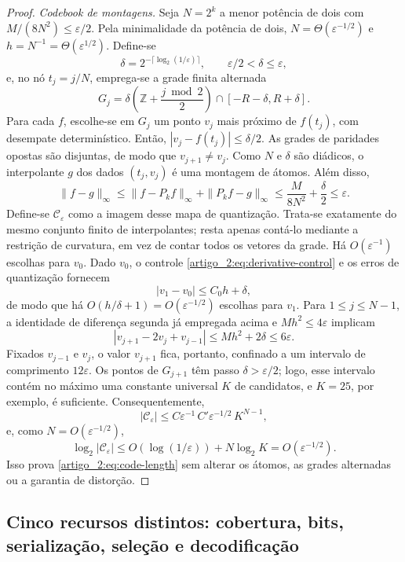 \documentclass[12pt,a4paper]{article}
\theoremstyle{preciso}
\theoremstyle{definition}
\theoremstyle{preciso}
\theoremstyle{preciso}
\theoremstyle{preciso}
\theoremstyle{preciso}
\theoremstyle{definition}
\theoremstyle{preciso}
\theoremstyle{definition}
\theoremstyle{preciso}
\theoremstyle{preciso}
\theoremstyle{definition}
\begin{document}
\begin{proof}
\emph{Codebook de montagens.} Seja $N=2^k$ a menor potência de dois com $M/(8N^2)\le\varepsilon/2$. Pela minimalidade da potência de dois, $N=\Theta(\varepsilon^{-1/2})$ e $h=N^{-1}=\Theta(\varepsilon^{1/2})$. Define-se
\[
 \delta=2^{-\lceil\log_2(1/\varepsilon)\rceil},
 \qquad \varepsilon/2<\delta\le\varepsilon,
\]
e, no nó $t_j=j/N$, emprega-se a grade finita alternada
\begin{equation}
 G_j=\delta\left(\mathbb{Z}+\frac{j\bmod2}{2}\right)
 \cap[-R-\delta,R+\delta].
 \label{artigo_2:eq:alternating-grid}
\end{equation}
Para cada $f$, escolhe-se em $G_j$ um ponto $v_j$ mais próximo de $f(t_j)$, com desempate determinístico. Então, $|v_j-f(t_j)|\le\delta/2$. As grades de paridades opostas são disjuntas, de modo que $v_{j+1}\neq v_j$. Como $N$ e $\delta$ são diádicos, o interpolante $g$ dos dados $(t_j,v_j)$ é uma montagem de átomos. Além disso,
\[
 \|f-g\|_\infty
 \le\|f-P_kf\|_\infty+\|P_kf-g\|_\infty
 \le\frac{M}{8N^2}+\frac\delta2\le\varepsilon.
\]
Define-se $\mathcal C_\varepsilon$ como a imagem desse mapa de quantização.
Trata-se exatamente do mesmo conjunto finito de interpolantes; resta apenas contá-lo
mediante a restrição de curvatura, em vez de contar todos os vetores da grade.
Há $O(\varepsilon^{-1})$ escolhas para $v_0$. Dado $v_0$, o controle
\eqref{artigo_2:eq:derivative-control} e os erros de quantização fornecem
\[
 |v_1-v_0|\le C_0h+\delta,
\]
de modo que há $O(h/\delta+1)=O(\varepsilon^{-1/2})$ escolhas para $v_1$.
Para $1\le j\le N-1$, a identidade de diferença segunda já empregada acima e
$Mh^2\le4\varepsilon$ implicam
\[
 |v_{j+1}-2v_j+v_{j-1}|
 \le Mh^2+2\delta\le6\varepsilon.
\]
Fixados $v_{j-1}$ e $v_j$, o valor $v_{j+1}$ fica, portanto, confinado a um
intervalo de comprimento $12\varepsilon$. Os pontos de $G_{j+1}$ têm passo
$\delta>\varepsilon/2$; logo, esse intervalo contém no máximo uma constante
universal $K$ de candidatos, e $K=25$, por exemplo, é suficiente. Consequentemente,
\[
 |\mathcal C_\varepsilon|
 \le C\varepsilon^{-1}\,C'\varepsilon^{-1/2}\,K^{N-1},
\]
e, como $N=O(\varepsilon^{-1/2})$,
\[
 \log_2|\mathcal C_\varepsilon|
 \le O(\log(1/\varepsilon))+N\log_2K
 =O(\varepsilon^{-1/2}).
\]
Isso prova \eqref{artigo_2:eq:code-length} sem alterar os átomos, as grades alternadas
ou a garantia de distorção.
\end{proof}

\subsection{Cinco recursos distintos: cobertura, bits, serialização, seleção e decodificação}
\end{document}
